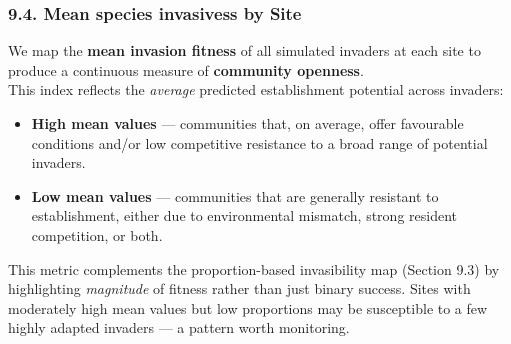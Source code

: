 \documentclass[
]{article}
\providecommand{\tightlist}{%
  \setlength{\itemsep}{0pt}\setlength{\parskip}{0pt}}
\begin{document}
\hypertarget{mean-species-invasivess-by-site}{%
\subsubsection{9.4. Mean species invasivess by
Site}\label{mean-species-invasivess-by-site}}

We map the \textbf{mean invasion fitness} of all simulated invaders at
each site to produce a continuous measure of \textbf{community
openness}.\\
This index reflects the \emph{average} predicted establishment potential
across invaders:

\begin{itemize}
\tightlist
\item
  \textbf{High mean values} --- communities that, on average, offer
  favourable conditions and/or low competitive resistance to a broad
  range of potential invaders.\\
\item
  \textbf{Low mean values} --- communities that are generally resistant
  to establishment, either due to environmental mismatch, strong
  resident competition, or both.
\end{itemize}

This metric complements the proportion-based invasibility map (Section
9.3) by highlighting \emph{magnitude} of fitness rather than just binary
success. Sites with moderately high mean values but low proportions may
be susceptible to a few highly adapted invaders --- a pattern worth
monitoring.
\end{document}
